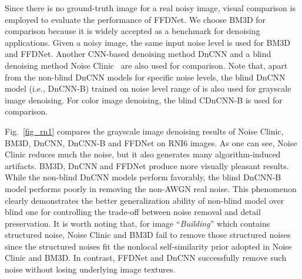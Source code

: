\documentclass[journal]{IEEEtran}
\begin{document}
\begin{figure*}[!htbp]
\begin{center}
\caption{Grayscale image denoising results by different methods on real noisy images. From top to bottom: noisy images, denoised images by Noise Clinic, denoised images by BM3D, denoised images by DnCNN, denoised images by DnCNN-B, denoised images by FFDNet. (a)  = 14 (15 for DnCNN); (b)  = 15; (c)  = 10; (d)  = 20; (e)  = 20; (f)  = 7 (10 for DnCNN).}\label{fig_rn1}
\end{center}
\end{figure*}


Since there is no ground-truth image for a real noisy image, visual comparison is employed to evaluate the performance of FFDNet. We choose BM3D for comparison because it is widely accepted as a benchmark for denoising applications. Given a noisy image, the same input noise level is used for BM3D and FFDNet. Another CNN-based denoising method DnCNN and a blind denoising method Noise Clinic~\cite{lebrun2015noise} are also used for comparison. Note that, apart from the non-blind DnCNN models for specific noise levels, the blind DnCNN model (i.e., DnCNN-B) trained on noise level range of  is also used for grayscale image denoising. For color image denoising, the blind CDnCNN-B is used for comparison.


Fig.~\ref{fig_rn1} compares the grayscale image denoising results of Noise Clinic, BM3D, DnCNN, DnCNN-B and FFDNet on RNI6 images. As one can see, Noise Clinic reduces much the noise, but it also generates many algorithm-induced artifacts. BM3D, DnCNN and FFDNet produce more visually pleasant results.
While the non-blind DnCNN models perform favorably, the blind DnCNN-B model performs poorly in removing the non-AWGN real noise. This phenomenon clearly demonstrates the better generalization ability of non-blind model over blind one for controlling the trade-off between noise removal and detail preservation.
It is worth noting that, for image ``\emph{Building}'' which contains structured noise, Noise Clinic and BM3D fail to remove those structured noises since the structured noises fit the nonlocal self-similarity prior adopted in Noise Clinic and BM3D. In contrast, FFDNet and DnCNN successfully remove such noise without losing underlying image textures.
\end{document}
